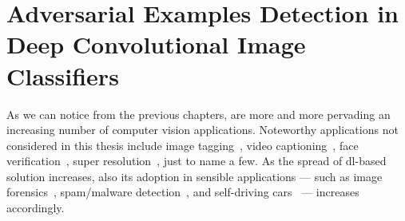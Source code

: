 
\graphicspath{{img/adversarial/}}

\chapter{Adversarial Examples Detection in Deep Convolutional Image Classifiers}
\label{ch:adversarial}

%

As we can notice from the previous chapters,  are more and more pervading an increasing number of computer vision applications.
Noteworthy applications not considered in this thesis include image tagging~\cite{li2016socializing}, video captioning~\cite{baraldi2016hierarchical}, face verification~\cite{schroff2015facenet,parkhi2015deep}, super resolution~\cite{dong2016image}, just to name a few.
As the spread of \gls{dl}-based solution increases, also its adoption in sensible applications --- such as image forensics~\cite{tuama2016camera,bayar2016deep,zhang2016image,amerini2017localization}, spam/malware detection~\cite{dahl2013large}, and self-driving cars~\cite{cirecsan2012multi} --- increases accordingly.

